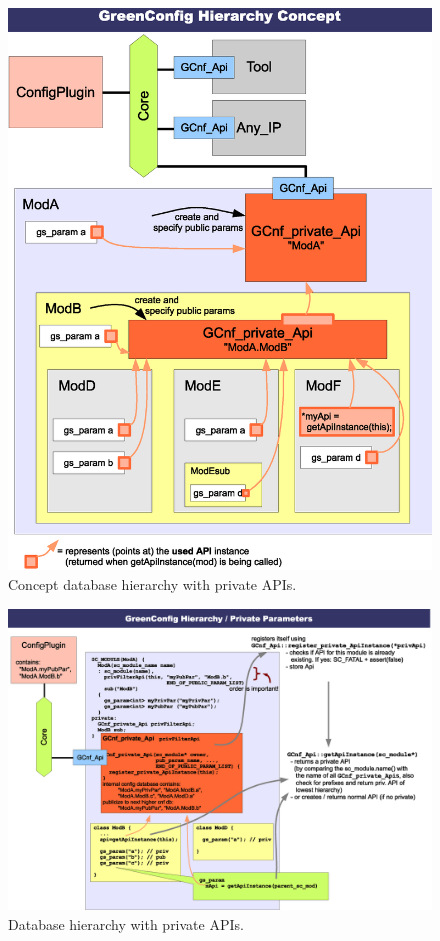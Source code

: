 \begin{figure}[htbp]
	\centerline{
		\includegraphics[width=14cm]{DatabaseHierarchyConcept.eps}}
	\caption{Concept database hierarchy with private APIs.}
	\label{fig:GCnfDatabaseHierarchyConcept}
\end{figure}

\begin{landscape}
\begin{figure}[htbp]
	\centerline{
		\includegraphics[width=20cm]{DatabaseHierarchy.eps}}
	\caption{Database hierarchy with private APIs.}
	\label{fig:GCnfDatabaseHierarchy}
\end{figure}
\end{landscape}

